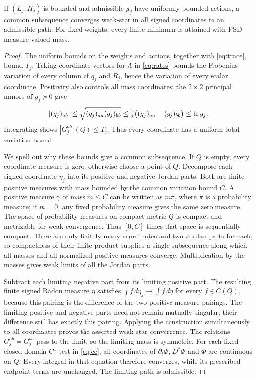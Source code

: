 \begin{lemma}\label{lem:compactness}
If $(L_j,H_j)$ is bounded and admissible $\mu_j$ have uniformly bounded
actions, a common subsequence converges weak-star in all signed coordinates
to an admissible path. For fixed weights, every finite minimum is attained
with PSD measure-valued mass.
\end{lemma}
\begin{proof}
The uniform bounds on the weights and actions, together with
\eqref{eq:trace}, bound $T_j$. Taking coordinate vectors for $A$ in
\eqref{eq:rates} bounds the Frobenius variation of every column of $q_j$
and $R_j$, hence the variation of every scalar coordinate. Positivity
also controls all mass coordinates: the $2\times2$ principal minors of
$g_j\succeq0$ give
\[
 |(g_j)_{ab}|\le\sqrt{(g_j)_{aa}(g_j)_{bb}}
 \le\tfrac12\bigl((g_j)_{aa}+(g_j)_{bb}\bigr)\le\operatorname{tr} g_j.
\]
Integrating shows $|G_j^{ab}|(Q)\le T_j$. Thus every coordinate has a
uniform total-variation bound.

We spell out why these bounds give a common subsequence. If $Q$ is
empty, every coordinate measure is zero; otherwise choose a point of $Q$.
Decompose each signed coordinate $\eta_j$ into its positive and negative Jordan parts.
Both are finite positive measures with mass bounded by the common
variation bound $C$. A positive measure $\gamma$ of mass $m\le C$ can be
written as $m\pi$, where $\pi$ is a probability measure; if $m=0$, any
fixed probability measure gives the same zero measure. The space of
probability measures on compact metric $Q$ is compact and metrizable for
weak convergence. Thus $[0,C]$ times that space is sequentially compact.
There are only finitely many coordinates and two Jordan parts for each,
so compactness of their finite product supplies a single subsequence
along which all masses and all normalized positive measures converge.
Multiplication by the masses gives weak limits of all the Jordan parts.

Subtract each limiting negative part from its limiting positive part.
The resulting finite signed Radon measure $\eta$ satisfies
$\int f\,d\eta_j\to\int f\,d\eta$ for every $f\in C(Q)$, because
this pairing is the difference of the two positive-measure pairings.
The limiting positive and negative parts need not remain mutually
singular; their difference still has exactly this pairing. Applying the
construction simultaneously to all coordinates proves the asserted
weak-star convergence. The relations
$G_j^{ab}=G_j^{ba}$ pass to the limit, so the limiting mass is symmetric.
For each fixed closed-domain $C^1$ test in \eqref{eq:ce}, all coordinates
of $\partial_t\Phi$, $D^*\Phi$ and $\Phi$ are continuous on $Q$.
Every integral in that equation therefore converges, while its prescribed
endpoint terms are unchanged. The limiting path is admissible.


\end{proof}
